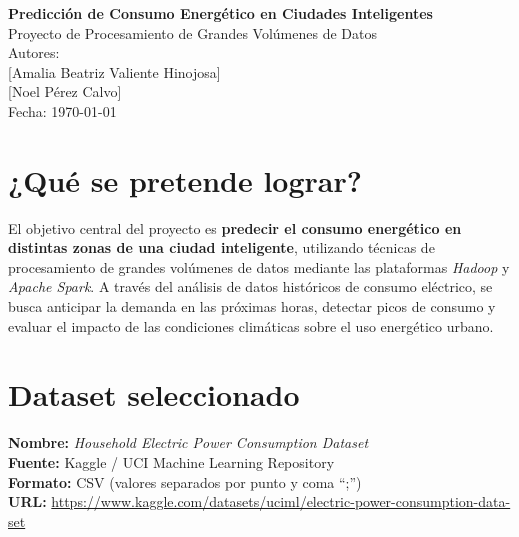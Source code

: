 \documentclass[12pt,a4paper]{article}
\begin{document}
\begin{titlepage}
    \centering
    \vspace*{3cm}
    {\LARGE\textbf{Predicción de Consumo Energético en Ciudades Inteligentes}}\\[1cm]
    {\Large Proyecto de Procesamiento de Grandes Volúmenes de Datos}\\[2cm]
    {\large Autores:}\\[0.3cm]
    {\large [Amalia Beatriz Valiente Hinojosa]}\\
    {\large [Noel Pérez Calvo]}\\[1cm]    
    {\large Fecha: \today}\\[4cm]
    \vfill
\end{titlepage}


\section{¿Qué se pretende lograr?}

El objetivo central del proyecto es \textbf{predecir el consumo energético en distintas zonas de una ciudad inteligente}, utilizando técnicas de procesamiento de grandes volúmenes de datos mediante las plataformas \textit{Hadoop} y \textit{Apache Spark}.  
A través del análisis de datos históricos de consumo eléctrico, se busca anticipar la demanda en las próximas horas, detectar picos de consumo y evaluar el impacto de las condiciones climáticas sobre el uso energético urbano.

\section{Dataset seleccionado}

\textbf{Nombre:} \textit{Household Electric Power Consumption Dataset} \\[0.2cm]
\textbf{Fuente:} Kaggle / UCI Machine Learning Repository \\[0.2cm]
\textbf{Formato:} CSV (valores separados por punto y coma “;”) \\[0.2cm]
\textbf{URL:} \href{https://www.kaggle.com/datasets/uciml/electric-power-consumption-data-set}{https://www.kaggle.com/datasets/uciml/electric-power-consumption-data-set}
\end{document}
